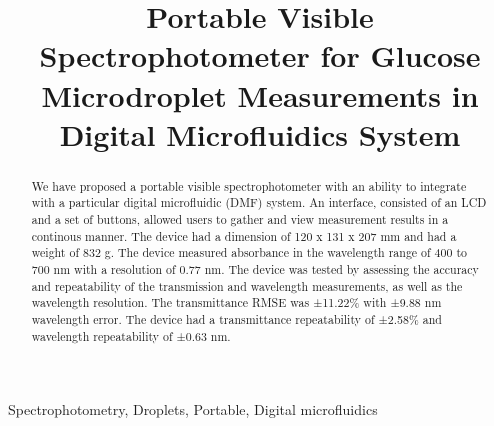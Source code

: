 \documentclass[conference]{IEEEtran}
\begin{document}
\makeatletter
\newcommand{\newlineauthors}{%
  \end{@IEEEauthorhalign}\hfill\mbox{}\par
  \mbox{}\hfill\begin{@IEEEauthorhalign}
}
\makeatother

\title{Portable Visible Spectrophotometer for Glucose Microdroplet Measurements in Digital Microfluidics System}

\author{
}

\maketitle

\begin{abstract}
We have proposed a portable visible spectrophotometer with an ability to integrate with a particular digital microfluidic (DMF) system.
An interface, consisted of an LCD and a set of buttons, allowed users to gather and view measurement results in a continous manner.
The device had a dimension of 120 x 131 x 207 mm and had a weight of 832 g.
The device measured absorbance in the wavelength range of 400 to 700 nm with a resolution of 0.77 nm.
The device was tested by assessing the accuracy and repeatability of the transmission and wavelength measurements, as well as the wavelength resolution.
The transmittance RMSE was ±11.22\% with ±9.88 nm wavelength error.
The device had a transmittance repeatability of ±2.58\% and wavelength repeatability of ±0.63 nm.
\end{abstract}

\begin{IEEEkeywords}
    Spectrophotometry, Droplets, Portable, Digital microfluidics
\end{IEEEkeywords}
\end{document}
